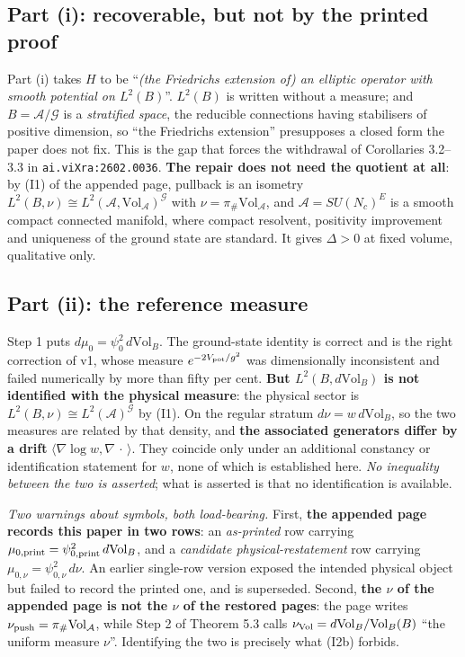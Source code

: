 \documentclass[11pt]{article}
\newcommand{\A}{\mathcal A}
\newcommand{\G}{\mathcal G}
\begin{document}
\subsection{Part (i): recoverable, but not by the printed proof}

Part (i) takes $H$ to be ``\emph{(the Friedrichs extension of) an elliptic operator with
smooth potential on $L^2(B)$}''. $L^2(B)$ is written without a measure; and $B=\A/\G$ is
a \emph{stratified space}, the reducible connections having stabilisers of positive
dimension, so ``the Friedrichs extension'' presupposes a closed form the paper does not
fix. This is the gap that forces the withdrawal of Corollaries 3.2--3.3 in
\texttt{ai.viXra:2602.0036}. \textbf{The repair does not need the quotient at all}: by
(I1) of the appended page, pullback is an isometry
$L^2(B,\nu)\cong L^2(\A,\mathrm{Vol}_{\A})^{\G}$ with $\nu=\pi_\#\mathrm{Vol}_{\A}$, and
$\A=SU(N_c)^E$ is a smooth compact connected manifold, where compact resolvent,
positivity improvement and uniqueness of the ground state are standard. It gives
$\Delta>0$ at fixed volume, qualitative only.

\subsection{Part (ii): the reference measure}

Step 1 puts $d\mu_0=\psi_0^2\,d\mathrm{Vol}_B$. The ground-state identity is correct and
is the right correction of v1, whose measure $e^{-2V_{\rm pot}/g^2}$ was dimensionally
inconsistent and failed numerically by more than fifty per cent. \textbf{But
$L^2(B,d\mathrm{Vol}_B)$ is not identified with the physical measure}: the physical
sector is $L^2(B,\nu)\cong L^2(\A)^{\G}$ by (I1). On the regular stratum
$d\nu=w\,d\mathrm{Vol}_B$, so the two measures are related by that density, and
\textbf{the associated generators differ by a drift}
$\langle\nabla\log w,\nabla\,\cdot\,\rangle$. They coincide only under an additional
constancy or identification statement for $w$, none of which is established here.
\emph{No inequality between the two is asserted}; what is asserted is that no
identification is available.

\emph{Two warnings about symbols, both load-bearing.} First, \textbf{the appended page
records this paper in two rows}: an \emph{as-printed} row carrying
$\mu_{0,\rm print}=\psi_{0,\rm print}^2\,d\mathrm{Vol}_B$, and a \emph{candidate
physical-restatement} row carrying $\mu_{0,\nu}=\psi_{0,\nu}^2\,d\nu$. An earlier
single-row version exposed the intended physical object but failed to record the
printed one, and is superseded. Second, \textbf{the $\nu$ of the appended page is not
the $\nu$ of the restored pages}: the page writes
$\nu_{\rm push}=\pi_\#\mathrm{Vol}_{\A}$, while Step 2 of Theorem 5.3 calls
$\nu_{\rm Vol}=d\mathrm{Vol}_B/\mathrm{Vol}_B(B)$ ``the uniform measure $\nu$''.
Identifying the two is precisely what (I2b) forbids.
\end{document}
